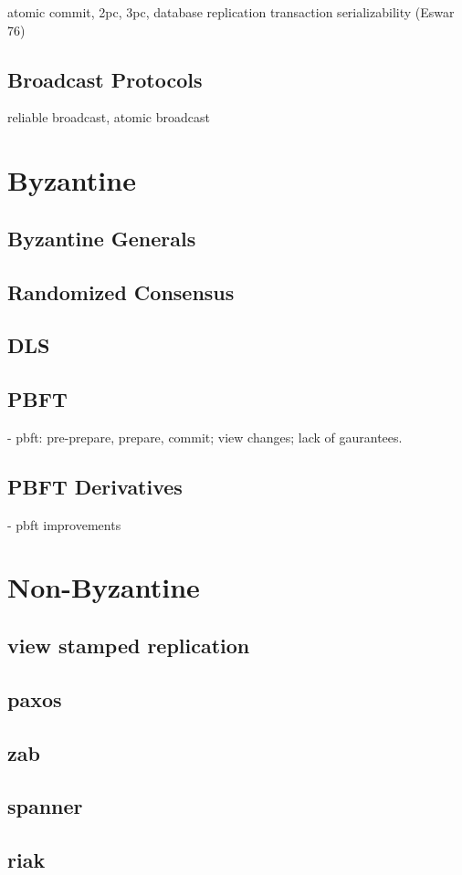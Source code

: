 atomic commit, 2pc, 3pc, database replication
transaction serializability (Eswar 76)

\subsection{Broadcast Protocols}
reliable broadcast, atomic broadcast

\section{Byzantine}
	\subsection{Byzantine Generals}
	\subsection{Randomized Consensus}
	\subsection{DLS}
	\subsection{PBFT}
		- pbft: pre-prepare, prepare, commit; view changes; lack of gaurantees.
	\subsection{PBFT Derivatives} 
		- pbft improvements

\section{Non-Byzantine}
	\subsection{view stamped replication}
	\subsection{paxos}
	\subsection{zab}
	\subsection{spanner}
	\subsection{riak}
